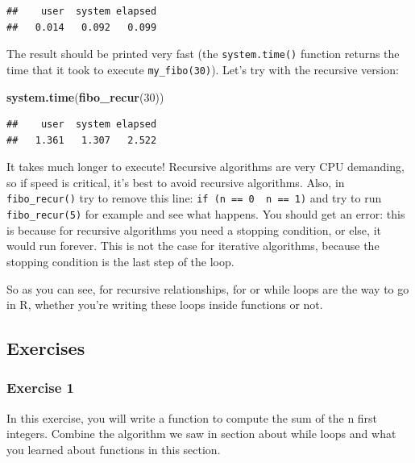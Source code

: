 \documentclass[]{gitbook}
\newenvironment{Shaded}{\begin{snugshade}}{\end{snugshade}}
\newcommand{\DecValTok}[1]{\textcolor[rgb]{0.00,0.00,0.81}{#1}}
\newcommand{\KeywordTok}[1]{\textcolor[rgb]{0.13,0.29,0.53}{\textbf{#1}}}
\newcommand{\NormalTok}[1]{#1}
\theoremstyle{definition}
\theoremstyle{definition}
\theoremstyle{definition}
\theoremstyle{remark}
\begin{document}
\begin{verbatim}
##    user  system elapsed 
##   0.014   0.092   0.099
\end{verbatim}

The result should be printed very fast (the \texttt{system.time()}
function returns the time that it took to execute
\texttt{my\_fibo(30)}). Let's try with the recursive version:

\begin{Shaded}
\begin{Highlighting}[]
\KeywordTok{system.time}\NormalTok{(}\KeywordTok{fibo_recur}\NormalTok{(}\DecValTok{30}\NormalTok{))}
\end{Highlighting}
\end{Shaded}

\begin{verbatim}
##    user  system elapsed 
##   1.361   1.307   2.522
\end{verbatim}

It takes much longer to execute! Recursive algorithms are very CPU
demanding, so if speed is critical, it's best to avoid recursive
algorithms. Also, in \texttt{fibo\_recur()} try to remove this line:
\texttt{if\ (n\ ==\ 0\ \textbar{}\textbar{}\ n\ ==\ 1)} and try to run
\texttt{fibo\_recur(5)} for example and see what happens. You should get
an error: this is because for recursive algorithms you need a stopping
condition, or else, it would run forever. This is not the case for
iterative algorithms, because the stopping condition is the last step of
the loop.

So as you can see, for recursive relationships, for or while loops are
the way to go in R, whether you're writing these loops inside functions
or not.

\hypertarget{exercises-4}{%
\subsection{Exercises}\label{exercises-4}}

\hypertarget{exercise-1-4}{%
\subsubsection*{Exercise 1}\label{exercise-1-4}}

In this exercise, you will write a function to compute the sum of the n
first integers. Combine the algorithm we saw in section about while
loops and what you learned about functions in this section.
\end{document}
